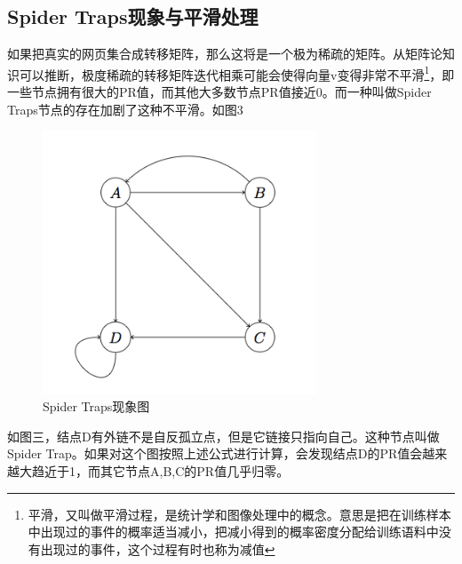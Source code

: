 \documentclass[UTF8
]{ctexart}
\begin{document}
\hypertarget{header-n85}{%
\subsection{Spider Traps现象与平滑处理}\label{header-n85}}
如果把真实的网页集合成转移矩阵，那么这将是一个极为稀疏的矩阵。从矩阵论知识可以推断，极度稀疏的转移矩阵迭代相乘可能会使得向量v变得非常不平滑\footnote{平滑，又叫做平滑过程，是统计学和图像处理中的概念。意思是把在训练样本中出现过的事件的概率适当减小，把减小得到的概率密度分配给训练语料中没有出现过的事件，这个过程有时也称为减值}，即一些节点拥有很大的PR值，而其他大多数节点PR值接近0。而一种叫做Spider Traps节点的存在加剧了这种不平滑。如图3
\begin{figure}[htbp]
	\centering
	\includegraphics[width=3.2in]{1_3.png}
	\caption{Spider Traps现象图}
	\label{img2}
\end{figure}
如图三，结点D有外链不是自反孤立点，但是它链接只指向自己。这种节点叫做Spider Trap。如果对这个图按照上述公式进行计算，会发现结点D的PR值会越来越大趋近于1，而其它节点A,B,C的PR值几乎归零。
\end{document}
